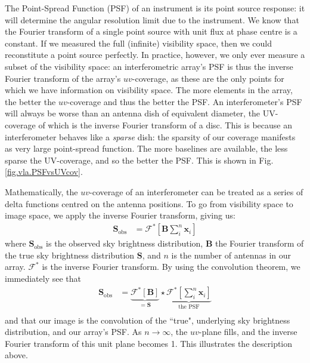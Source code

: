 \pg
The Point-Spread Function (PSF) of an instrument is its point source response: it will determine the angular resolution limit due to the instrument. We know that the Fourier transform of a single point source with unit flux at phase centre is a constant. If we measured the full (infinite) visibility space, then we could reconstitute a point source perfectly. In practice, however, we only ever measure a subset of the visibility space: an interferometric array's PSF is thus the inverse Fourier transform of the array's $uv$-coverage, as these are the only points for which we have information on visibility space. The more elements in the array, the better the $uv$-coverage and thus the better the PSF. An interferometer's PSF will always be worse than an antenna dish of equivalent diameter, the UV-coverage of which is the inverse Fourier transform of a disc. This is because an interferometer behaves like a \emph{sparse} dish: the sparsity of our coverage manifests as very large point-spread function. The more baselines are available, the less sparse the UV-coverage, and so the better the PSF. This is shown in Fig. \ref{fig.vla.PSFvsUVcov}.

\pg
Mathematically, the $uv$-coverage of an interferometer can be treated as a series of delta functions centred on the antenna positions. To go from visibility space to image space, we apply the inverse Fourier transform, giving us:
\begin{align}
\mathbf{S}_{\mathrm{obs}} &= \mathcal{F}^*\left[ \mathbf{B} \sum_i^{n} \mathbf{x}_i \right]
\end{align}
where $\mathbf{S}_{\mathrm{obs}}$ is the observed sky brightness distribution, $\mathbf{B}$ the Fourier transform of the true sky brightness distribution $\mathbf{S}$, and $n$ is the number of antennas in our array. $\mathcal{F}^*$ is the inverse Fourier transform. By using the convolution theorem, we immediately see that
\begin{align}
\mathbf{S}_{\mathrm{obs}} &= \underbrace{\mathcal{F}^*\left[ \mathbf{B}\right]}_{=\mathbf{S}} \star \underbrace{\mathcal{F}^*\left[\sum_i^{n}\mathbf{x}_i \right]}_{\text{the PSF}}\\
\end{align}
and that our image is the convolution of the ``true", underlying sky brightness distribution, and our array's PSF. As $n \rightarrow \infty$, the $uv$-plane fills, and the inverse Fourier transform of this unit plane becomes 1. This illustrates the description above.


